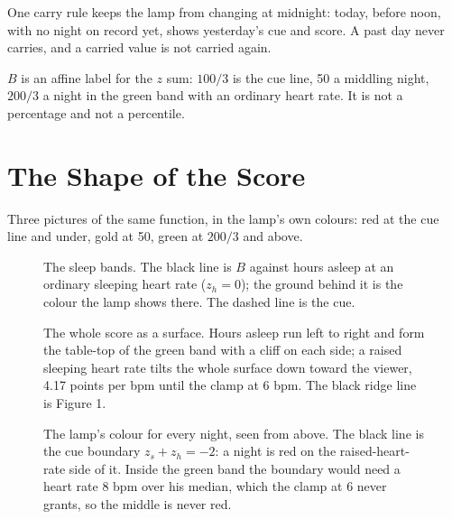 \documentclass[11pt]{article}
\begin{document}
One carry rule keeps the lamp from changing at midnight: today, before noon, with
no night on record yet, shows yesterday's cue and score. A past day never
carries, and a carried value is not carried again.

$B$ is an affine label for the $z$ sum: $100/3$ is the cue line, 50 a middling
night, $200/3$ a night in the green band with an ordinary heart rate. It is not a
percentage and not a percentile.

\section{The Shape of the Score}
Three pictures of the same function, in the lamp's own colours: red at the cue
line and under, gold at 50, green at $200/3$ and above.

\begin{figure}[h!]
\centering
{}
\caption{The sleep bands. The black line is $B$ against hours asleep at an
ordinary sleeping heart rate ($z_h = 0$); the ground behind it is the colour the
lamp shows there. The dashed line is the cue.}
\end{figure}

\begin{figure}[h!]
\centering
{}
\caption{The whole score as a surface. Hours asleep run left to right and form
the table-top of the green band with a cliff on each side; a raised sleeping
heart rate tilts the whole surface down toward the viewer, 4.17 points per bpm
until the clamp at 6 bpm. The black ridge line is Figure 1.}
\end{figure}

\begin{figure}[h!]
\centering
{}
\caption{The lamp's colour for every night, seen from above. The black line is
the cue boundary $z_s + z_h = -2$: a night is red on the raised-heart-rate side
of it. Inside
the green band the boundary would need a heart rate 8 bpm over his median, which
the clamp at 6 never grants, so the middle is never red.}
\end{figure}
\clearpage
\end{document}
